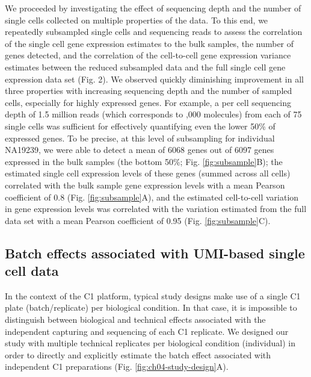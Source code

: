 We proceeded by investigating the effect of sequencing depth and the
number of single cells collected on multiple properties of the
data. To this end, we repeatedly subsampled single cells and
sequencing reads to assess the correlation of the single cell gene
expression estimates to the bulk samples, the number of genes
detected, and the correlation of the cell-to-cell gene expression
variance estimates between the reduced subsampled data and the full
single cell gene expression data set (Fig.  2). We observed quickly
diminishing improvement in all three properties with increasing
sequencing depth and the number of sampled cells, especially for
highly expressed genes. For example, a per cell sequencing depth of
1.5 million reads (which corresponds to ,000 molecules) from
each of 75 single cells was sufficient for effectively quantifying
even the lower 50\% of expressed genes. To be precise, at this level
of subsampling for individual NA19239, we were able to detect a mean
of 6068 genes out of 6097 genes expressed in the bulk samples (the
bottom 50\%; Fig. \ref{fig:subsample}B); the estimated single cell
expression levels of these genes (summed across all cells) correlated
with the bulk sample gene expression levels with a mean Pearson
coefficient of 0.8 (Fig. \ref{fig:subsample}A), and the estimated
cell-to-cell variation in gene expression levels was correlated with
the variation estimated from the full data set with a mean Pearson
coefficient of 0.95 (Fig. \ref{fig:subsample}C).

\subsection{Batch effects associated with UMI-based single cell
data}\label{batch-effects-associated-with-umi-based-single-cell-data}

In the context of the C1 platform, typical study designs make use of a
single C1 plate (batch/replicate) per biological condition. In that
case, it is impossible to distinguish between biological and technical
effects associated with the independent capturing and sequencing of
each C1 replicate. We designed our study with multiple technical
replicates per biological condition (individual) in order to directly
and explicitly estimate the batch effect associated with independent
C1 preparations (Fig. \ref{fig:ch04-study-design}A).


